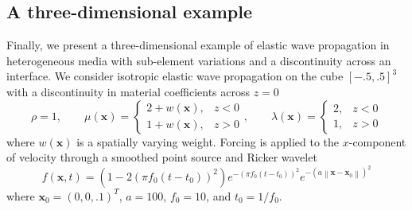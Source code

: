 \documentclass{siamart0216}
\newcommand{\nor}[1]{\left\| #1 \right\|}
\newcommand{\LRp}[1]{\left( #1 \right)}
\begin{document}
\subsection{A three-dimensional example}

Finally, we present a three-dimensional example of elastic wave propagation in heterogeneous media with sub-element variations and a discontinuity across an interface.  We consider isotropic elastic wave propagation on the cube $[-.5,.5]^3$ with a discontinuity in material coefficients across $z = 0$
\[
\rho = 1, \qquad \mu(\bm{x}) = \begin{cases}
2 + w(\bm{x}), & z < 0\\
1 + w(\bm{x}), & z > 0
\end{cases},
\qquad
\lambda(\bm{x}) = \begin{cases}
2, & z < 0\\
1, & z > 0
\end{cases}
\]
where $w(\bm{x})$ is a spatially varying weight.  
Forcing is applied to the $x$-component of velocity through a smoothed point source and Ricker wavelet
\[
f(\bm{x},t) = \LRp{1 - 2(\pi f_0 (t-t_0))^2} e^{-(\pi f_0 (t-t_0))^2}e^{- \LRp{a \nor{\bm{x}-\bm{x}_0}}^2}
\]
where $\bm{x}_0 = (0,0,.1)^T$, $a = 100$, $f_0 = 10$, and $t_0 = 1/f_0$.  
\end{document}
